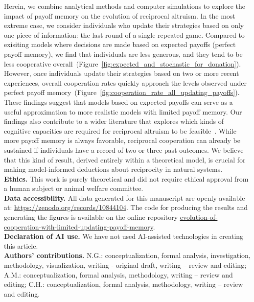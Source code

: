 \documentclass[11pt]{article}
\newcommand{\FigBaseResults}{Figure~\ref{fig:expected_and_stochastic_for_donation}}
\newcommand{\FigHigherMemory}{Figure~\ref{fig:cooperation_rate_all_updating_payoffs}}
\theoremstyle{plainCl1}
\theoremstyle{plainCl2}
\providecommand{\DIFaddtex}[1]{{\protect\color{blue}\uwave{#1}}} %
\providecommand{\DIFaddbegin}{} %
\providecommand{\DIFaddend}{} %
\providecommand{\DIFadd}[1]{\texorpdfstring{\DIFaddtex{#1}}{#1}} %
\begin{document}
Herein, we combine analytical methods and computer simulations to explore the impact of payoff memory on the evolution of reciprocal altruism. 
In the most extreme case, we consider individuals who update their strategies based on only one piece of information:  the last round of a single repeated game. 
Compared to exisiting models where decisions are made based on expected payoffs (perfect payoff memory), we find that individuals are less generous, and they tend to be less cooperative overall~(\FigBaseResults). 
However, once individuals update their strategies based on two or more recent experiences, overall cooperation rates quickly approach the levels observed under perfect payoff memory~(\FigHigherMemory). 
These findings suggest that models based on expected payoffs can serve as a useful approximation to more realistic models with limited payoff memory. 
Our findings also contribute to a wider literature that explores which kinds of cognitive capacities are required for reciprocal altruism to be feasible~\citep[e.g.,][]{Stevens:fip:2011,Volstorf:PlosOne:2011}. 
While more payoff memory is always favorable, reciprocal cooperation can already be sustained if individuals have a record of two or three past outcomes. We believe that this kind of result, derived entirely within a theoretical model, is crucial for making model-informed deductions about reciprocity in natural systems.\\[0.5cm]


\noindent
{\bf Ethics.}
This work is purely theoretical and did not require ethical approval from a human subject or animal welfare committee.\\

\noindent
{\bf Data accessibility.}
All data generated for this manuscript are openly available at:
\href{https://zenodo.org/records/10844104}{https://zenodo.org/records/10844104}.
The code for producing the results and generating the figures is available
on the online \DIFaddbegin \DIFadd{GitHub }\DIFaddend repository
\href{https://github.com/Nikoleta-v3/evolution-of-cooperation-with-limited-updating-payoff-memory}{evolution-of-cooperation-with-limited-updating-payoff-memory}.\\

\noindent
{\bf Declaration of AI use.}
We have not used AI-assisted technologies in creating this article.\\

\noindent
{\bf Authors' contributions.}
N.G.: conceptualization, formal analysis, investigation, methodology, visualization, writing - original draft, writing -- review and editing; 
A.M.: conceptualization, formal analysis, methodology, writing -- review and editing; 
C.H.: conceptualization, formal analysis, methodology, writing -- review and editing.\\
\end{document}
